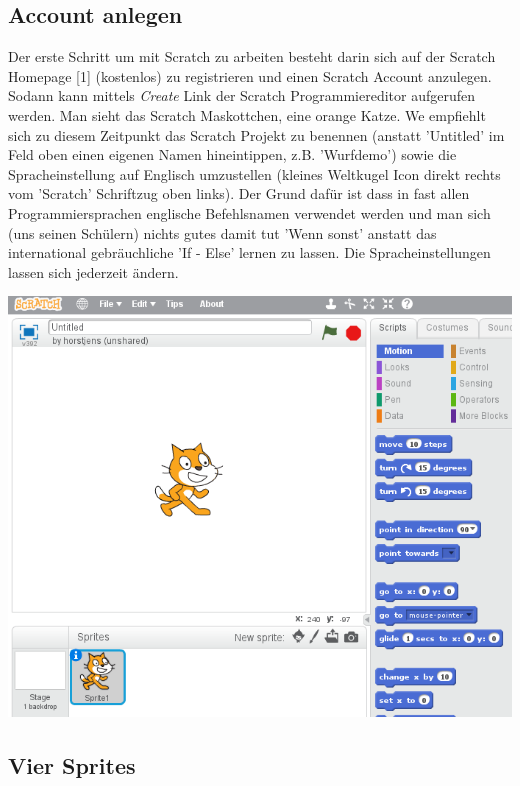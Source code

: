 \subsection*{Account anlegen}

Der erste Schritt um mit Scratch zu arbeiten besteht darin sich auf der Scratch Homepage [1] (kostenlos) zu registrieren und einen Scratch Account anzulegen. Sodann kann mittels \textit{Create} Link der Scratch Programmiereditor aufgerufen werden. Man sieht das Scratch Maskottchen, eine orange Katze. We empfiehlt sich zu diesem Zeitpunkt das Scratch Projekt zu benennen (anstatt 'Untitled' im Feld oben einen eigenen Namen hineintippen, z.B. 'Wurfdemo') sowie die Spracheinstellung auf Englisch umzustellen (kleines Weltkugel Icon direkt rechts vom 'Scratch' Schriftzug oben links). Der Grund dafür ist dass in fast allen Programmiersprachen englische Befehlsnamen verwendet werden und man sich (uns seinen Schülern) nichts gutes damit tut 'Wenn sonst' anstatt das international gebräuchliche 'If - Else' lernen zu lassen. Die Spracheinstellungen lassen sich jederzeit ändern.

\begin{center}
\includegraphics[width=\linewidth]{scratch/fstart.png}
\end{center}

\subsection*{Vier Sprites}

